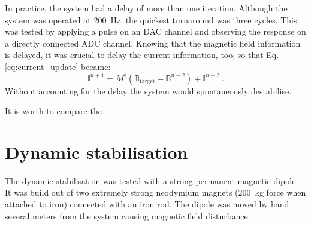In practice, the system had a delay of more than one iteration. Although the system was operated at \SI{200}{\hertz}, the quickest turnaround was three cycles. This was tested by applying a pulse on an DAC channel and observing the response on a directly connected ADC channel. Knowing that the magnetic field information is delayed, it was crucial to delay the current information, too, so that Eq.\,\ref{eq:current_update} became:
\begin{equation}
  \mathbb{I}^{n+1} = M^\dagger \left( \mathbb{B}_\text{target} - \mathbb{B}^{n-2} \right) + \mathbb{I}^{n-2} \ .
\end{equation}
Without accounting for the delay the system would spontaneously destabilise.

It is worth to compare the 






\section{Dynamic stabilisation}
The dynamic stabilisation was tested with a strong permanent magnetic dipole. It was build out of two extremely strong neodymium magnets (\SI{200}{\kilo\gram} force when attached to iron) connected with an iron rod. The dipole was moved by hand several meters from the system causing magnetic field disturbance.


